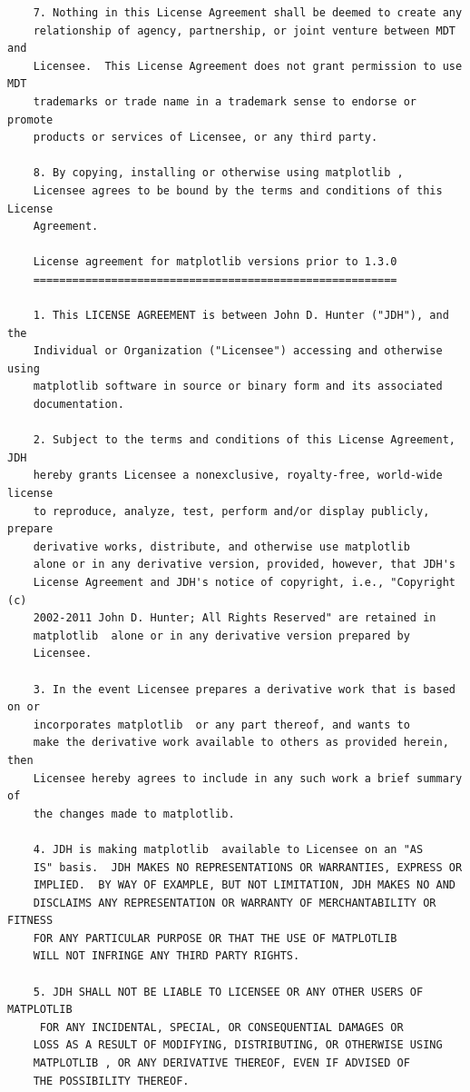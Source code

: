 \documentclass{article}
\begin{document}
\begin{verbatim}
    7. Nothing in this License Agreement shall be deemed to create any
    relationship of agency, partnership, or joint venture between MDT and
    Licensee.  This License Agreement does not grant permission to use MDT
    trademarks or trade name in a trademark sense to endorse or promote
    products or services of Licensee, or any third party.
    
    8. By copying, installing or otherwise using matplotlib ,
    Licensee agrees to be bound by the terms and conditions of this License
    Agreement.
    
    License agreement for matplotlib versions prior to 1.3.0
    ========================================================
    
    1. This LICENSE AGREEMENT is between John D. Hunter ("JDH"), and the
    Individual or Organization ("Licensee") accessing and otherwise using
    matplotlib software in source or binary form and its associated
    documentation.
    
    2. Subject to the terms and conditions of this License Agreement, JDH
    hereby grants Licensee a nonexclusive, royalty-free, world-wide license
    to reproduce, analyze, test, perform and/or display publicly, prepare
    derivative works, distribute, and otherwise use matplotlib
    alone or in any derivative version, provided, however, that JDH's
    License Agreement and JDH's notice of copyright, i.e., "Copyright (c)
    2002-2011 John D. Hunter; All Rights Reserved" are retained in
    matplotlib  alone or in any derivative version prepared by
    Licensee.
    
    3. In the event Licensee prepares a derivative work that is based on or
    incorporates matplotlib  or any part thereof, and wants to
    make the derivative work available to others as provided herein, then
    Licensee hereby agrees to include in any such work a brief summary of
    the changes made to matplotlib.
    
    4. JDH is making matplotlib  available to Licensee on an "AS
    IS" basis.  JDH MAKES NO REPRESENTATIONS OR WARRANTIES, EXPRESS OR
    IMPLIED.  BY WAY OF EXAMPLE, BUT NOT LIMITATION, JDH MAKES NO AND
    DISCLAIMS ANY REPRESENTATION OR WARRANTY OF MERCHANTABILITY OR FITNESS
    FOR ANY PARTICULAR PURPOSE OR THAT THE USE OF MATPLOTLIB
    WILL NOT INFRINGE ANY THIRD PARTY RIGHTS.
    
    5. JDH SHALL NOT BE LIABLE TO LICENSEE OR ANY OTHER USERS OF MATPLOTLIB
     FOR ANY INCIDENTAL, SPECIAL, OR CONSEQUENTIAL DAMAGES OR
    LOSS AS A RESULT OF MODIFYING, DISTRIBUTING, OR OTHERWISE USING
    MATPLOTLIB , OR ANY DERIVATIVE THEREOF, EVEN IF ADVISED OF
    THE POSSIBILITY THEREOF.
    

\end{verbatim}
\end{document}

